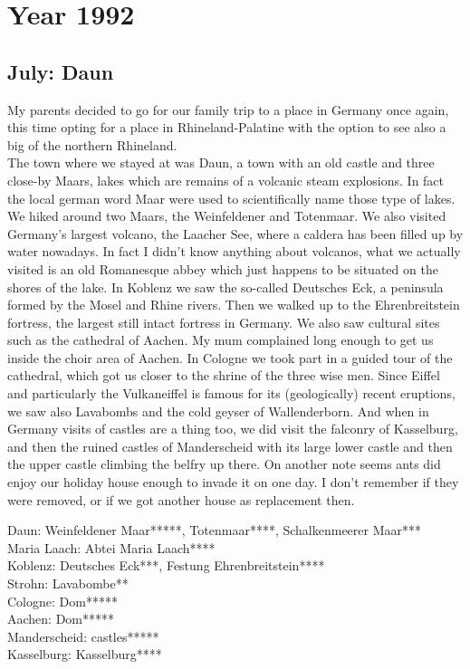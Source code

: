 \chapter{Year 1992}
\label{1992}

\section{July: Daun}
\label{1992:Daun}

My parents decided to go for our family trip to a place in Germany once again, this time opting for a place in Rhineland-Palatine with the option to see also a big of the northern Rhineland. \\ 

The town where we stayed at was Daun, a town with an old castle and three close-by Maars, lakes which are remains of a volcanic steam explosions. In fact the local german word Maar were used to scientifically name those type of lakes. We hiked around two Maars, the Weinfeldener and Totenmaar. We also visited Germany's largest volcano, the Laacher See, where a caldera has been filled up by water nowadays. In fact I didn't know anything about volcanos, what we actually visited is an old Romanesque abbey which just happens to be situated on the shores of the lake. In Koblenz we saw the so-called Deutsches Eck, a peninsula formed by the Mosel and Rhine rivers. Then we walked up to the Ehrenbreitstein fortress, the largest still intact fortress in Germany. We also saw cultural sites such as the cathedral of Aachen. My mum complained long enough to get us inside the choir area of Aachen. In Cologne we took part in a guided tour of the cathedral, which got us closer to the shrine of the three wise men. Since Eiffel and particularly the Vulkaneiffel is famous for its (geologically) recent eruptions, we saw also Lavabombs and the cold geyser of Wallenderborn. And when in Germany visits of castles are a thing too, we did visit the falconry of Kasselburg, and then the ruined castles of Manderscheid with its large lower castle and then the upper castle climbing the belfry up there. On another note seems ants did enjoy our holiday house enough to invade it on one day. I don't remember if they were removed, or if we got another house as replacement then. 

Daun: Weinfeldener Maar*****, Totenmaar****, Schalkenmeerer Maar***\\
Maria Laach: Abtei Maria Laach****\\
Koblenz: Deutsches Eck***, Festung Ehrenbreitstein****\\
Strohn: Lavabombe**\\
Cologne: Dom*****\\
Aachen: Dom*****\\
Manderscheid: castles*****\\
Kasselburg: Kasselburg****\\

